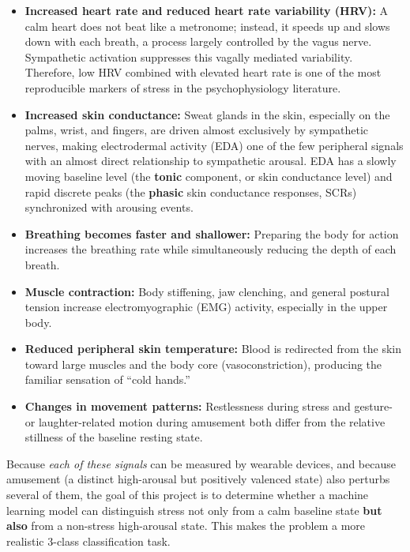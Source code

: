 \documentclass[12pt,a4paper]{article}
\begin{document}
	\begin{itemize}
		\item \textbf{Increased heart rate and reduced heart rate variability (HRV):} A calm heart does not beat like a metronome; instead, it speeds up and slows down with each breath, a process largely controlled by the vagus nerve. Sympathetic activation suppresses this vagally mediated variability. Therefore, low HRV combined with elevated heart rate is one of the most reproducible markers of stress in the psychophysiology literature.
		
		\item \textbf{Increased skin conductance:} Sweat glands in the skin, especially on the palms, wrist, and fingers, are driven almost exclusively by sympathetic nerves, making electrodermal activity (EDA) one of the few peripheral signals with an almost direct relationship to sympathetic arousal. EDA has a slowly moving baseline level (the \textbf{tonic} component, or skin conductance level) and rapid discrete peaks (the \textbf{phasic} skin conductance responses, SCRs) synchronized with arousing events.
		
		\item \textbf{Breathing becomes faster and shallower:} Preparing the body for action increases the breathing rate while simultaneously reducing the depth of each breath.
		
		\item \textbf{Muscle contraction:} Body stiffening, jaw clenching, and general postural tension increase electromyographic (EMG) activity, especially in the upper body.
		
		\item \textbf{Reduced peripheral skin temperature:} Blood is redirected from the skin toward large muscles and the body core (vasoconstriction), producing the familiar sensation of ``cold hands.''
		
		\item \textbf{Changes in movement patterns:} Restlessness during stress and gesture- or laughter-related motion during amusement both differ from the relative stillness of the baseline resting state.
	\end{itemize}
	
	Because \textit{each of these signals} can be measured by wearable devices, and because amusement (a distinct high-arousal but positively valenced state) also perturbs several of them, the goal of this project is to determine whether a machine learning model can distinguish stress not only from a calm baseline state \textbf{but also} from a non-stress high-arousal state. This makes the problem a more realistic 3-class classification task.
	
\end{document}
